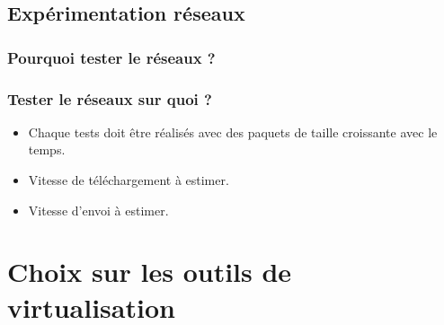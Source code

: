 \subsection{Expérimentation réseaux}

\subsubsection{Pourquoi tester le réseaux ? }

\subsubsection{Tester le réseaux sur quoi ?  }

\begin{itemize}
\item Chaque tests doit être réalisés avec des paquets de taille croissante avec le temps.
\item Vitesse de téléchargement à estimer.
\item Vitesse d'envoi à estimer.
\end{itemize}

\section{Choix sur les outils de virtualisation}


